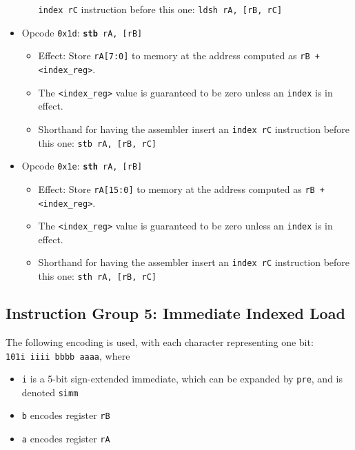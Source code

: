 \documentclass{article}
\begin{document}
\begin{itemize}
\begin{itemize}
		\texttt{index rC} instruction before this one:
			\texttt{ldsh rA, [rB, rC]}
		\end{itemize}
	\item Opcode \texttt{0x1d}:
		\texttt{\textbf{stb} rA, [rB]}
		\begin{itemize}
		\item Effect: Store \texttt{rA[7:0]} to memory at the address
		computed as \texttt{rB + <index\_reg>}.
		\item The \texttt{<index\_reg>} value is guaranteed to be zero
		unless an \texttt{index} is in effect.
		\item Shorthand for having the assembler insert an
		\texttt{index rC} instruction before this one:
			\texttt{stb rA, [rB, rC]}
		\end{itemize}
	\item Opcode \texttt{0x1e}:
		\texttt{\textbf{sth} rA, [rB]}
		\begin{itemize}
		\item Effect: Store \texttt{rA[15:0]} to memory at the address
		computed as \texttt{rB + <index\_reg>}.
		\item The \texttt{<index\_reg>} value is guaranteed to be zero
		unless an \texttt{index} is in effect.
		\item Shorthand for having the assembler insert an
		\texttt{index rC} instruction before this one:
			\texttt{sth rA, [rB, rC]}
		\end{itemize}
	\end{itemize}

	\doublespacing
	\subsection{Instruction Group 5: Immediate Indexed Load}
	The following encoding is used, with each character representing one
	bit: \\
	\texttt{101i iiii bbbb aaaa}, where

	\singlespacing
	\begin{itemize}
	\item \texttt{i} is a 5-bit sign-extended immediate, which can
	be expanded by \texttt{pre}, and is denoted \texttt{simm}
	\item \texttt{b} encodes register \texttt{rB}
	\item \texttt{a} encodes register \texttt{rA}
	\end{itemize}
	\doublespacing
\end{document}
